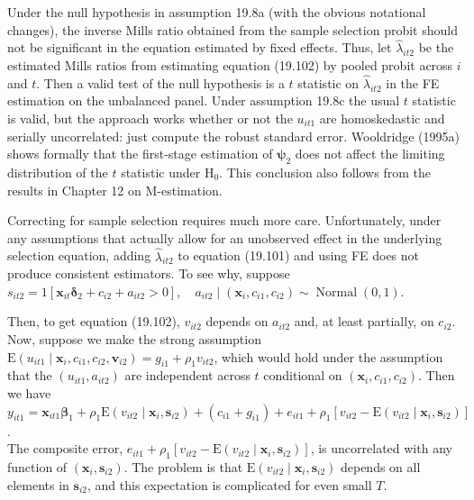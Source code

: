 \documentclass[10pt]{article}
\begin{document}
Under the null hypothesis in assumption 19.8a (with the obvious notational changes), the inverse Mills ratio obtained from the sample selection probit should not be significant in the equation estimated by fixed effects. Thus, let $\hat{\lambda}_{i t 2}$ be the estimated Mills ratios from estimating equation (19.102) by pooled probit across $i$ and $t$. Then a valid test of the null hypothesis is a $t$ statistic on $\hat{\lambda}_{i t 2}$ in the FE estimation on the unbalanced panel. Under assumption 19.8c the usual $t$ statistic is valid, but the approach works whether or not the $u_{i t 1}$ are homoskedastic and serially uncorrelated: just compute the robust standard error. Wooldridge (1995a) shows formally that the first-stage estimation of $\boldsymbol{\psi}_{2}$ does not affect the limiting distribution of the $t$ statistic under $\mathrm{H}_{0}$. This conclusion also follows from the results in Chapter 12 on M-estimation.

Correcting for sample selection requires much more care. Unfortunately, under any assumptions that actually allow for an unobserved effect in the underlying selection equation, adding $\hat{\lambda}_{i t 2}$ to equation (19.101) and using FE does not produce consistent estimators. To see why, suppose\\
$s_{i t 2}=1\left[\mathbf{x}_{i t} \boldsymbol{\delta}_{2}+c_{i 2}+a_{i t 2}>0\right], \quad a_{i t 2} \mid\left(\mathbf{x}_{i}, c_{i 1}, c_{i 2}\right) \sim \operatorname{Normal}(0,1)$.

Then, to get equation (19.102), $v_{i t 2}$ depends on $a_{i t 2}$ and, at least partially, on $c_{i 2}$. Now, suppose we make the strong assumption $\mathrm{E}\left(u_{i t 1} \mid \mathbf{x}_{i}, c_{i 1}, c_{i 2}, \mathbf{v}_{i 2}\right)=g_{i 1}+\rho_{1} v_{i t 2}$, which would hold under the assumption that the $\left(u_{i t 1}, a_{i t 2}\right)$ are independent across $t$ conditional on $\left(\mathbf{x}_{i}, c_{i 1}, c_{i 2}\right)$. Then we have\\
$y_{i t 1}=\mathbf{x}_{i t 1} \boldsymbol{\beta}_{1}+\rho_{1} \mathrm{E}\left(v_{i t 2} \mid \mathbf{x}_{i}, \mathbf{s}_{i 2}\right)+\left(c_{i 1}+g_{i 1}\right)+e_{i t 1}+\rho_{1}\left[v_{i t 2}-\mathrm{E}\left(v_{i t 2} \mid \mathbf{x}_{i}, \mathbf{s}_{i 2}\right)\right]$.\\
The composite error, $e_{i t 1}+\rho_{1}\left[v_{i t 2}-\mathrm{E}\left(v_{i t 2} \mid \mathbf{x}_{i}, \mathbf{s}_{i 2}\right)\right]$, is uncorrelated with any function of $\left(\mathbf{x}_{i}, \mathbf{s}_{i 2}\right)$. The problem is that $\mathrm{E}\left(v_{i t 2} \mid \mathbf{x}_{i}, \mathbf{s}_{i 2}\right)$ depends on all elements in $\mathbf{s}_{i 2}$, and this expectation is complicated for even small $T$.
\end{document}
